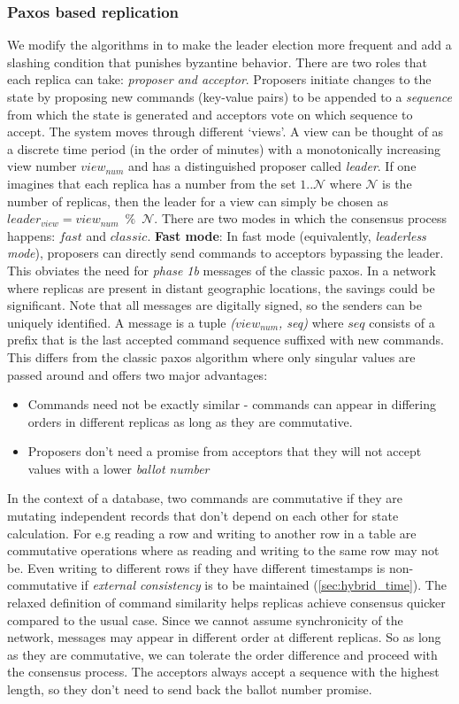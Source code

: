  \subsubsection{Paxos based replication}
 We modify the algorithms in \cite{byzantine_paxos} to make the leader election more frequent and add a slashing condition that punishes byzantine behavior. There are two roles that each replica can take: \textit{proposer and acceptor}. Proposers initiate changes to the state by proposing new commands (key-value pairs) to be appended to a \textit{sequence} from which the state is generated and acceptors vote on which sequence to accept. The system moves through different `views'. A view can be thought of as a discrete time period (in the order of minutes) with a monotonically increasing view number $view_{num}$ and has a distinguished proposer called \textit{leader}. If one imagines that each replica has a number from the set ${1..\mathcal{N}}$ where $\mathcal{N}$ is the number of replicas, then the leader for a view can simply be chosen as $leader_{view} = view_{num} \enspace \% \enspace \mathcal{N}$. There are two modes in which the consensus process happens: $fast$ and $classic$.
\newline\newline
\textbf{Fast mode}: In fast mode (equivalently, \textit{leaderless mode}), proposers can directly send commands to acceptors bypassing the leader. This obviates the need for \textit{phase 1b} messages of the classic paxos. In a network where replicas are present in distant geographic locations, the savings could be significant. Note that all messages are digitally signed, so the senders can be uniquely identified. A message is a tuple \textit{($view_{num}$, seq)} where $seq$ consists of a prefix that is the last accepted command sequence suffixed with new commands. This differs from the classic paxos algorithm where only singular values are passed around and offers two major advantages:
\begin{itemize}
	\item Commands need not be exactly similar - commands can appear in differing orders in different replicas as long as they are commutative.
	\item Proposers don't need a promise from acceptors that they will not accept values with a lower \textit{ballot number} 
\end{itemize}
In the context of a database, two commands are commutative if they are mutating independent records that don't depend on each other for state calculation. For e.g reading a row and writing to another row in a table are commutative operations where as reading and writing to the same row may not be. Even writing to different rows if they have different timestamps is non-commutative if \textit{external consistency} is to be maintained (\cref{sec:hybrid_time}). The relaxed definition of command similarity helps replicas achieve consensus quicker compared to the usual case. Since we cannot assume synchronicity of the network, messages may appear in different order at different replicas. So as long as they are commutative, we can tolerate the order difference and proceed with the consensus process. The acceptors always accept a sequence with the highest length, so they don't need to send back the ballot number promise.
